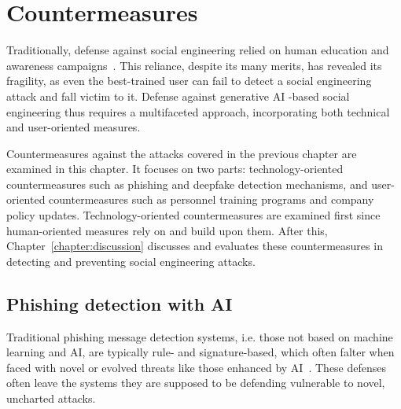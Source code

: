 

\chapter{Countermeasures\label{chapter:countermeasures}}

Traditionally, defense against social engineering relied on human education and awareness campaigns~\citep{fakhouri_AI_Driven_Solutions_SE_Attacks_2024}. This reliance, despite its many merits, has revealed its fragility, as even the best-trained user can fail to detect a social engineering attack and fall victim to it. Defense against generative AI -based social engineering thus requires a multifaceted approach, incorporating both technical and user-oriented measures.

Countermeasures against the attacks covered in the previous chapter are examined in this chapter. It focuses on two parts: technology-oriented countermeasures such as phishing and deepfake detection mechanisms, and user-oriented countermeasures such as personnel training programs and company policy updates. Technology-oriented countermeasures are examined first since human-oriented measures rely on and build upon them. After this, Chapter~\ref{chapter:discussion} discusses and evaluates these countermeasures in detecting and preventing social engineering attacks.


\section{Phishing detection with AI}

Traditional phishing message detection systems, i.e. those not based on machine learning and AI, are typically rule- and signature-based, which often falter when faced with novel or evolved threats like those enhanced by AI~\citep{fakhouri_AI_Driven_Solutions_SE_Attacks_2024}. These defenses often leave the systems they are supposed to be defending vulnerable to novel, uncharted attacks.

